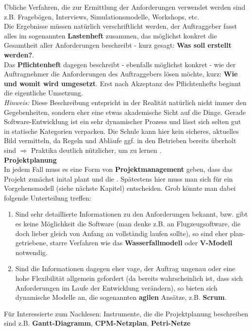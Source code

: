 \documentclass{article}
\begin{document}
Übliche Verfahren, die zur Ermittlung der Anforderungen verwendet werden sind z.B. Fragebögen, Interviews, Simulationsmodelle, Workshops, etc.  \\
Die Ergebnisse müssen natürlich verschriftlicht werden, der Auftraggeber fasst alles im sogenannten \textbf{Lastenheft} zusammen, das möglichst konkret die Gesamtheit aller Anforderungen beschreibt - kurz gesagt: \textbf{Was soll erstellt werden?}. \\
Das \textbf{Pflichtenheft} dagegen beschreibt - ebenfalls möglichst konkret - wie der Auftragnehmer die Anforderungen des Auftraggebers lösen möchte, kurz: \textbf{Wie und womit wird umgesetzt}. Erst nach Akzeptanz des Pflichtenhefts beginnt die eigentliche Umsetzung. \\
\textit{Hinweis:} Diese Beschreibung entspricht in der Realität natürlich nicht immer den Gegebenheiten, sondern eher eine etwas akademische Sicht auf die Dinge. Gerade Software-Entwicklung ist ein sehr dynamischer Prozess und lässt sich selten gut in statische Kategorien verpacken. Die Schule kann hier kein sicheres, aktuelles Bild vermitteln, da Regeln und Abläufe ggf. in den Betrieben bereits überholt sind $\Rightarrow$ Praktika deutlich nützlicher, um zu lernen . \vspace{3mm} \\
\textbf{Projektplanung} \\
In jedem Fall muss es eine Form von \textbf{Projektmanagement} geben, dass das Projekt zunächst inital plant und die . Spätestens hier muss man sich für ein Vorgehensmodell (siehe nächste Kapitel) entscheiden. Grob könnte man dabei folgende Unterteilung treffen:
\begin{enumerate}
    \item Sind sehr detaillierte Informationen zu den Anforderungen bekannt, bzw. gibt es keine Möglichkeit die Software  (man denke z.B. an Flugzeugsoftware, die doch lieber gleich von Anfang an vollständig laufen sollte), so sind eher plan-getriebene, starre Verfahren wie das \textbf{Wasserfallmodell} oder \textbf{V-Modell} notwendig. 
    \item Sind die Informationen dagegen eher vage, der Auftrag ungenau oder eine hohe Flexibilität allgemein gefordert (da bereits wahrscheinlich ist, dass sich Anforderungen im Laufe der Entwicklung verändern), so bieten sich dynamische Modelle an, die sogenannten \textbf{agilen} Ansätze, z.B. \textbf{Scrum}. 
\end{enumerate}
Für Interessierte zum Nachlesen: Instrumente, die die Projektplanung beschreiben sind z.B. \textbf{Gantt-Diagramm}, \textbf{CPM-Netzplan}, \textbf{Petri-Netze} \vspace{3mm} \\
\end{document}
